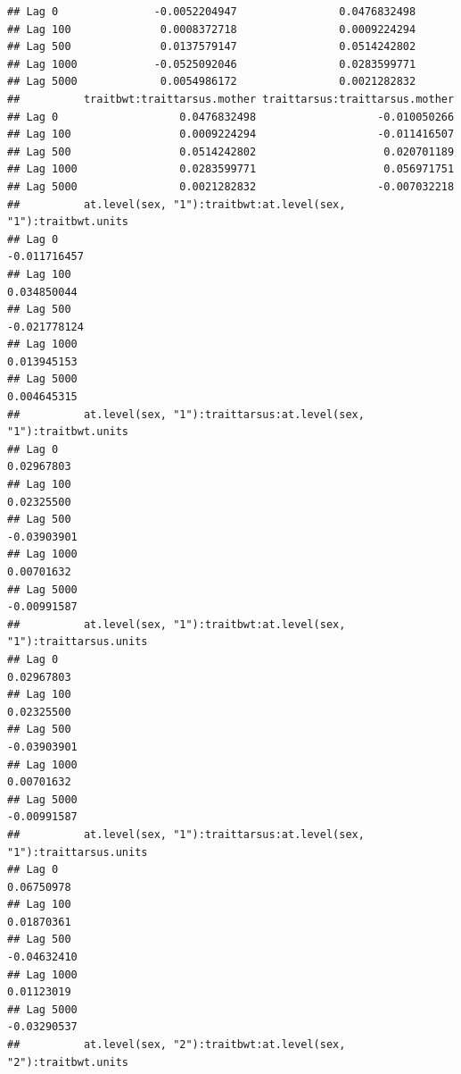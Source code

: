 \documentclass[
  12pt,
]{book}
\begin{document}
\begin{verbatim}
## Lag 0               -0.0052204947                0.0476832498
## Lag 100              0.0008372718                0.0009224294
## Lag 500              0.0137579147                0.0514242802
## Lag 1000            -0.0525092046                0.0283599771
## Lag 5000             0.0054986172                0.0021282832
##          traitbwt:traittarsus.mother traittarsus:traittarsus.mother
## Lag 0                   0.0476832498                   -0.010050266
## Lag 100                 0.0009224294                   -0.011416507
## Lag 500                 0.0514242802                    0.020701189
## Lag 1000                0.0283599771                    0.056971751
## Lag 5000                0.0021282832                   -0.007032218
##          at.level(sex, "1"):traitbwt:at.level(sex, "1"):traitbwt.units
## Lag 0                                                     -0.011716457
## Lag 100                                                    0.034850044
## Lag 500                                                   -0.021778124
## Lag 1000                                                   0.013945153
## Lag 5000                                                   0.004645315
##          at.level(sex, "1"):traittarsus:at.level(sex, "1"):traitbwt.units
## Lag 0                                                          0.02967803
## Lag 100                                                        0.02325500
## Lag 500                                                       -0.03903901
## Lag 1000                                                       0.00701632
## Lag 5000                                                      -0.00991587
##          at.level(sex, "1"):traitbwt:at.level(sex, "1"):traittarsus.units
## Lag 0                                                          0.02967803
## Lag 100                                                        0.02325500
## Lag 500                                                       -0.03903901
## Lag 1000                                                       0.00701632
## Lag 5000                                                      -0.00991587
##          at.level(sex, "1"):traittarsus:at.level(sex, "1"):traittarsus.units
## Lag 0                                                             0.06750978
## Lag 100                                                           0.01870361
## Lag 500                                                          -0.04632410
## Lag 1000                                                          0.01123019
## Lag 5000                                                         -0.03290537
##          at.level(sex, "2"):traitbwt:at.level(sex, "2"):traitbwt.units

\end{verbatim}
\end{document}
